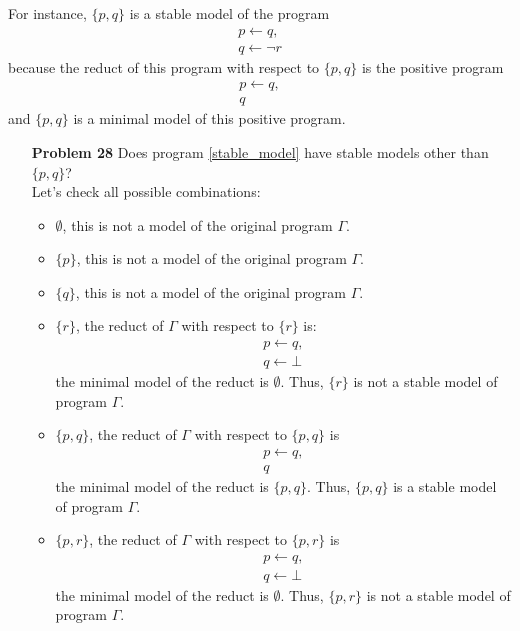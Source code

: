 For instance, $\{p, q\}$ is a stable model of the program
\begin{equation}
\begin{gathered}
p \leftarrow q,  \\
q \leftarrow \neg r
\end{gathered}
\label{stable_model}
\end{equation}
because the reduct of this program with respect to $\{p, q\}$ is the positive program
\begin{equation*}
\begin{gathered}
p \leftarrow q,  \\
q 
\end{gathered}
\end{equation*}
and $\{p, q\}$ is a minimal model of this positive program. 

\begin{enumerate}
\item[\textbf{Problem 28}] Does program \eqref{stable_model} have stable models other than $\{p, q\}$? \\
Let's check all possible combinations:
\begin{itemize}
\item $\emptyset$, this is not a model of the original program $\Gamma$. 
\item $\{p\}$, this is not a model of the original program $\Gamma$. 
\item $\{q\}$, this is not a model of the original program $\Gamma$. 
\item $\{r\}$, the reduct of $\Gamma$ with respect to $\{r\}$ is:
\begin{equation*}
\begin{gathered}
p \leftarrow q,  \\
q \leftarrow \bot 
\end{gathered}
\end{equation*}
the minimal model of the reduct is $\emptyset$. Thus, $\{r\}$ is not a stable model of program $\Gamma$. 
\item $\{p, q\}$, the reduct of $\Gamma$ with respect to $\{p, q\}$ is
\begin{equation*}
\begin{gathered}
p \leftarrow q,  \\
q 
\end{gathered}
\end{equation*}
the minimal model of the reduct is $\{p, q\}$. Thus, $\{p, q\}$ is a stable model of program $\Gamma$. 

\item $\{p, r\}$, the reduct of $\Gamma$ with respect to $\{p, r\}$ is
\begin{equation*}
\begin{gathered}
p \leftarrow q,  \\
q \leftarrow \bot
\end{gathered}
\end{equation*}
the minimal model of the reduct is $\emptyset$. Thus, $\{p, r\}$ is not a stable model of program $\Gamma$. 


\end{itemize}
\end{enumerate}
